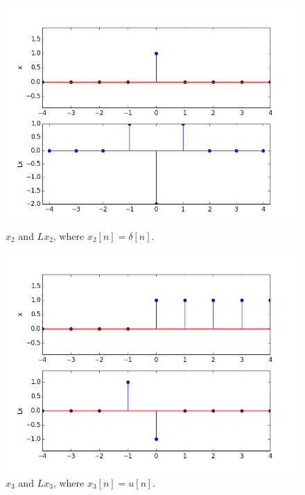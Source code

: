 \begin{enumerate}[(a)]
\begin{figure}[htbp]
	\centering
	\includegraphics[width=\textwidth,trim={0.2in 0.2in 0.2in 0.2in},clip]{images/p2-2}
	\caption{$x_2$ and $Lx_2$, where $x_2[n] = \delta[n]$.}
	\label{fig:p2-2}
\end{figure}

\begin{figure}[htbp]
	\centering
	\includegraphics[width=\textwidth,trim={0.2in 0.2in 0.2in 0.2in},clip]{images/p2-3}
	\caption{$x_3$ and $Lx_3$, where $x_3[n] = u[n]$.}
	\label{fig:p2-3}
\end{figure}
\end{enumerate}